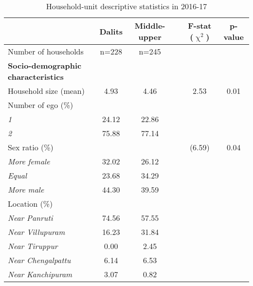 \begin{table}[htbp]
  \raggedright
  \caption{Household-unit descriptive statistics in 2016-17}
    \begin{tabular}{lccccc}
    \toprule
          & Dalits & Middle-upper  &     & F-stat ($\upchi^2$) & p-value \\
    \midrule
    Number of households & n=228 & n=245 &       &       &  \\
    \textbf{Socio-demographic characteristics} &       &       &       &       &      \\
	Household size (mean) & 4.93  & 4.46  &       & 2.53  & 0.01 \\
    Number of ego (\%) &       &       &       &       &  \\
    \hspace*{0.1cm} \textit{1} & 24.12 & 22.86 &       &       &  \\
    \hspace*{0.1cm} \textit{2} & 75.88 & 77.14 &       &       &  \\
    Sex ratio (\%) &       &       &       & (6.59) & 0.04 \\
    \hspace*{0.1cm} \textit{More female} & 32.02 & 26.12 &       &       &  \\
    \hspace*{0.1cm} \textit{Equal} & 23.68 & 34.29 &       &       &  \\
    \hspace*{0.1cm} \textit{More male} & 44.30 & 39.59 &       &       &  \\
    Location (\%) &       &       &       &       &  \\
    \hspace*{0.1cm} \textit{Near Panruti} & 74.56 & 57.55 &       &       &  \\
    \hspace*{0.1cm} \textit{Near Villupuram} & 16.23 & 31.84 &       &       &  \\
    \hspace*{0.1cm} \textit{Near Tiruppur} & 0.00  & 2.45  &       &       &  \\
    \hspace*{0.1cm} \textit{Near Chengalpattu} & 6.14  & 6.53  &       &       &  \\
    \hspace*{0.1cm} \textit{Near Kanchipuram} & 3.07  & 0.82  &       &       &  \\

\end{tabular}
\end{table}
